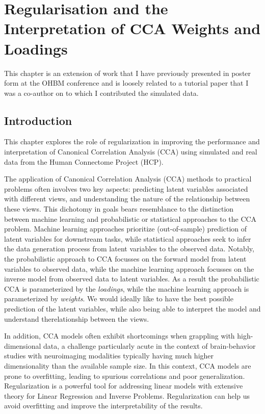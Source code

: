 \chapter{Regularisation and the Interpretation of CCA Weights and Loadings}\label{chap:als}
\minitoc

This chapter is an extension of work that I have previously presented in poster form at the OHBM conference and is
loosely related to a tutorial paper that I was a co-author on \cite{mihalik2022canonical} to which I contributed the
simulated data.

\section{Introduction}\label{sec:introduction}

This chapter explores the role of regularization in improving the performance and interpretation of Canonical
Correlation Analysis (CCA) using simulated and real data from the Human Connectome Project (HCP).

The application of Canonical Correlation Analysis (CCA) methods to practical problems often involves two key aspects: predicting latent variables associated with different views, and understanding the nature of the relationship between these views.
This dichotomy in goals bears resemblance to the distinction between machine learning and probabilistic or statistical approaches to the CCA problem.
Machine learning approaches prioritize (out-of-sample) prediction of latent variables for downstream tasks, while statistical approaches seek to infer the data generation process from latent variables to the observed data.
Notably, the probabilistic approach to CCA focusses on the forward model from latent variables to observed data, while the machine learning approach focusses on the inverse model from observed data to latent variables.
As a result the probabilistic CCA is parameterized by the \textit{loadings}, while the machine learning approach is parameterized by \textit{weights}.
We would ideally like to have the best possible prediction of the latent variables, while also being able to interpret the model and understand therelationship between the views.

In addition, CCA models often exhibit shortcomings when grappling with high-dimensional data, a challenge particularly acute in the context of brain-behavior studies with neuroimaging modalities typically having much higher dimensionality than the available sample size.
In this context, CCA models are prone to overfitting, leading to spurious correlations and poor generalization.
Regularization is a powerful tool for addressing linear models with extensive theory for Linear Regression and Inverse Problems.
Regularization can help us avoid overfitting and improve the interpretability of the results.

